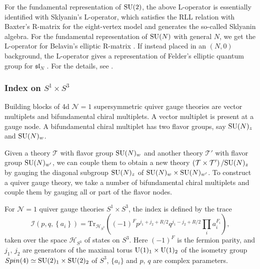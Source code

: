 For the fundamental representation of $\mathrm{SU}(2)$, the above L-operator
is essentially identified with Sklyanin's L-operator, which satisfies
the RLL relation with Baxter's R-matrix for the eight-vertex model
and generates the so-called Sklyanin algebra. For the fundamental
representation of $\mathrm{SU}(N)$ with general $N$, we get the L-operator
for Belavin's elliptic R-matrix \cite{Belavin:1981ix}. If instead placed in
an $\left( N,0 \right)$ background, the L-operator gives a representation
of Felder's elliptic quantum group for $\mathfrak{sl}_{N}$ \cite{Felder:1994pb,Felder:1994be,MR1606760}. 
For the
details, see \cite{Yagi:2017hmj}.



\subsubsection*{Index on $S^{1}\times S^{3}$}

Building blocks of 4d $\mathcal{N}=1$ supersymmetric quiver gauge
theories are vector multiplets and bifundamental chiral multiplets.
A vector multiplet is present at a gauge node. A bifundamental chiral
multiplet has two flavor groups, say $\mathrm{SU}(N)_{z}$ and $\mathrm{SU}(N)_{w}$.

Given a theory $\mathcal{T}$ with flavor group $\mathrm{SU}(N)_{w}$ and another
theory $\mathcal{T}'$ with flavor group $\mathrm{SU}(N)_{w'}$, we can couple
them to obtain a new theory $\left(\mathcal{T}\times\mathcal{T}'\right)/\mathrm{SU}(N)_{z}$
by gauging the diagonal subgroup $\mathrm{SU}(N)_{z}$ of $\mathrm{SU}(N)_{w}\times \mathrm{SU}(N)_{w'}$.
To construct a quiver gauge theory, we take a number of bifundamental
chiral multiplets and couple them by gauging all or part of the flavor
nodes. 

For $\mathcal{N}=1$ quiver gauge theories $S^{1}\times S^{3}$, the
index is defined by the trace
\begin{equation}
    \mathcal{I}(p,q,\left\{ a_{i}\right\} )  
      =  \mathrm{Tr}_{\mathcal{H}_{S^{3}}}  
      \left(    \left( -1 \right)^{F}  p^{j_{1}+j_{2}+R/2}  q^{j_{1}-j_{2}+R/2}  \prod_{i}a_{i}^{F_{i}}    \right),
\end{equation}
taken over the space $\mathcal{H}_{S^{3}}$ of states on $S^{3}$.
Here $\left(-1\right)^{F}$ is the fermion parity, and $j_{1},\,j_{2}$
are generators of the maximal torus $\mathrm{U}(1)_{1}\times \mathrm{U}(1)_{2}$ of
the isometry group $Spin(4)\simeq \mathrm{SU}(2)_{1}\times \mathrm{SU}(2)_{2}$ of $S^{3}$,
$\{ a_i \}$ and $p,\,q$ are complex parameters. 

